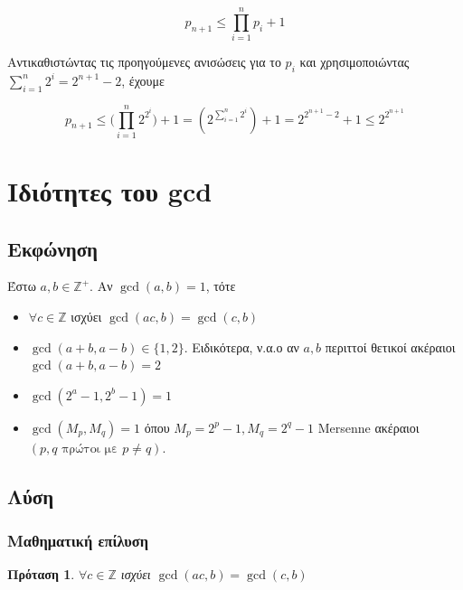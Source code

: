 \documentclass[oneside]{article}
\newtheorem*{lemma}{Πρόταση}
\begin{document}
\begin{equation}
    p_{n+1} \leq \prod_{i=1}^n p_i + 1
\end{equation}

Αντικαθιστώντας τις προηγούμενες ανισώσεις για το $p_i$ και χρησιμοποιώντας $\sum_{i=1}^{n} 2^i = 2^{n+1} - 2$, έχουμε

\begin{equation}
    p_{n+1} \leq \big( \prod_{i=1}^n 2^{2^{i}} \big) + 1 = (2^{\sum_{i=1}^{n} 2^i}) + 1 = 2^{2^{n+1}-2} + 1 \leq 2^{2^{n+1}}
\end{equation}

\section{Ιδιότητες του gcd}

\subsection{Εκφώνηση}

Έστω $a,b \in \mathbb{Z}^+ $. Αν $\gcd(a,b) = 1$, τότε

\begin{itemize}
    \item $\forall c \in \mathbb{Z}$ ισχύει $\gcd(ac, b) = \gcd(c, b)$
    \item $\gcd(a+b, a-b) \in \{1,2\}$. Ειδικότερα, ν.α.ο αν $a,b$ περιττοί θετικοί ακέραιοι $\gcd(a+b,a-b) = 2$
    \item $\gcd(2^a - 1, 2^b - 1) = 1$
    \item $\gcd(M_p, M_q) = 1$ όπου $M_p = 2^p - 1, M_q = 2^q - 1$ Mersenne ακέραιοι $(p, q \text{ πρώτοι με } p \neq q)$.
\end{itemize}

\subsection{Λύση} 

\subsubsection{Μαθηματική επίλυση}

\begin{lemma}
    $\forall c \in \mathbb{Z}$ ισχύει $\gcd(ac, b) = \gcd(c, b)$
\end{lemma}
\end{document}
